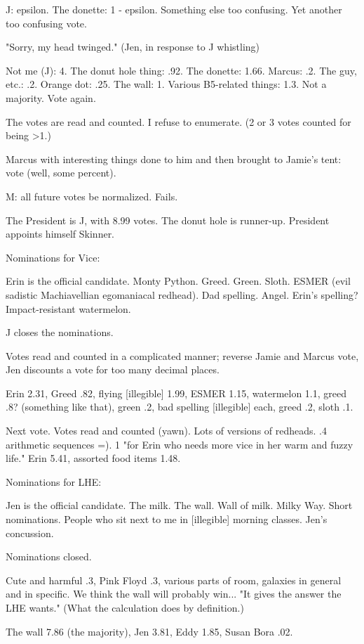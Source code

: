 \documentclass[12pt]{article}
\begin{document}
J: epsilon. The donette: 1 - epsilon. Something else too confusing. Yet another too confusing vote.

"Sorry, my head twinged." (Jen, in response to J whistling)

Not me (J): 4. The donut hole thing: .92. The donette: 1.66. Marcus: .2. The guy, etc.: .2. Orange dot: .25. The wall: 1. Various B5-related things: 1.3. Not a majority. Vote again.

The votes are read and counted. I refuse to enumerate. (2 or 3 votes counted for being >1.)

Marcus with interesting things done to him and then brought to Jamie's tent: vote (well, some percent).

M: all future votes be normalized. Fails.

The President is J, with 8.99 votes. The donut hole is runner-up. President appoints himself Skinner.

Nominations for Vice:

Erin is the official candidate. Monty Python. Greed. Green. Sloth. ESMER (evil sadistic Machiavellian egomaniacal redhead). Dad spelling. Angel. Erin's spelling? Impact-resistant watermelon.

J closes the nominations.

Votes read and counted in a complicated manner; reverse Jamie and Marcus vote, Jen discounts a vote for too many decimal places.

Erin 2.31, Greed .82, flying [illegible] 1.99, ESMER 1.15, watermelon 1.1, greed .8? (something like that), green .2, bad spelling [illegible] each, greed .2, sloth .1.

Next vote. Votes read and counted (yawn). Lots of versions of redheads. .4 arithmetic sequences =). 1 "for Erin who needs more vice in her warm and fuzzy life." Erin 5.41, assorted food items 1.48.

Nominations for LHE:

Jen is the official candidate. The milk. The wall. Wall of milk. Milky Way. Short nominations. People who sit next to me in [illegible] morning classes. Jen's concussion.

Nominations closed.

Cute and harmful .3, Pink Floyd .3, various parts of room, galaxies in general and in specific. We think the wall will probably win... "It gives the answer the LHE wants." (What the calculation does by definition.)

The wall 7.86 (the majority), Jen 3.81, Eddy 1.85, Susan Bora .02.
\end{document}
